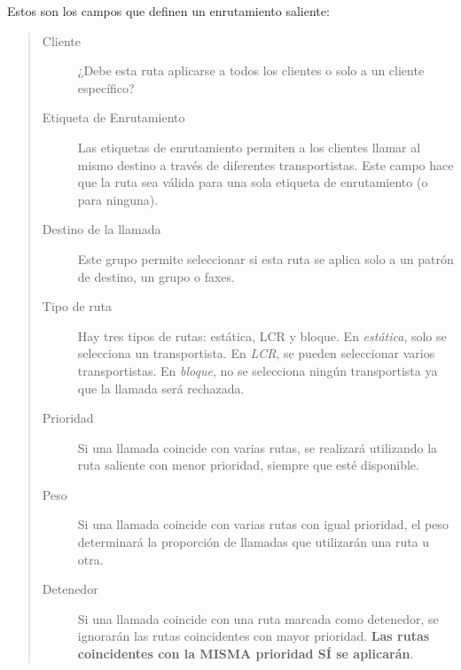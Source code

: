 \documentclass[letterpaper,10pt,spanish]{sphinxmanual}
\begin{document}
Estos son los campos que definen un enrutamiento saliente:
\begin{quote}
\begin{description}
\item[{Cliente}] \leavevmode
¿Debe esta ruta aplicarse a todos los clientes o solo a un cliente específico?

\item[{Etiqueta de Enrutamiento}] \leavevmode
Las etiquetas de enrutamiento permiten a los clientes llamar al mismo destino a través de diferentes transportistas. Este campo hace que la ruta sea válida para una sola etiqueta de enrutamiento (o para ninguna).

\item[{Destino de la llamada}] \leavevmode
Este grupo permite seleccionar si esta ruta se aplica solo a un patrón de destino, un grupo o faxes.

\item[{Tipo de ruta}] \leavevmode
Hay tres tipos de rutas: estática, LCR y bloque. En \emph{estática}, solo se selecciona un transportista. En \emph{LCR}, se pueden seleccionar varios transportistas. En \emph{bloque}, no se selecciona ningún transportista ya que la llamada será rechazada.

\item[{Prioridad}] \leavevmode
Si una llamada coincide con varias rutas, se realizará utilizando la ruta saliente con menor prioridad, siempre que esté disponible.

\item[{Peso}] \leavevmode
Si una llamada coincide con varias rutas con igual prioridad, el peso determinará la proporción de llamadas que utilizarán una ruta u otra.

\item[{Detenedor}] \leavevmode
Si una llamada coincide con una ruta marcada como detenedor, se ignorarán las rutas coincidentes con mayor prioridad. \textbf{Las rutas coincidentes con la MISMA prioridad SÍ se aplicarán}.

\end{description}
\end{quote}
\end{document}
